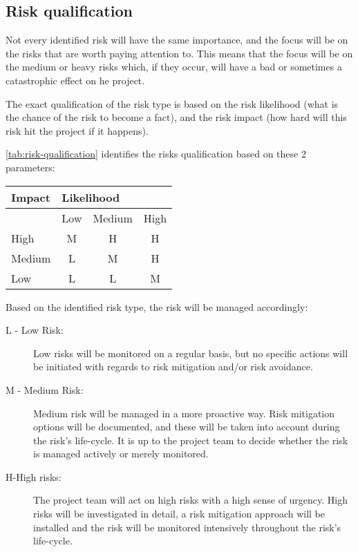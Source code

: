 \subsection{Risk qualification}
Not every identified risk will have the same importance, and the focus will be on the risks that are worth paying attention to.
This means that the focus will be on the medium or heavy risks which, if they occur, will have a bad or sometimes a catastrophic effect on he project.

The exact qualification of the risk type is based on the risk likelihood (what is the chance of the risk to become a fact), and the risk impact (how hard will this risk hit the project if it happens).

\autoref{tab:risk-qualification} identifies the risks qualification based on these 2 parameters:

\begin{table}[h]
\centering
\begin{tabular}{|l|c|c|c|}
\hline
Impact & \multicolumn{3}{l|}{Likelihood}                                                     \\ \hline
       & \multicolumn{1}{l|}{Low}  & \multicolumn{1}{l|}{Medium} & \multicolumn{1}{l|}{High} \\ \hline
High   & \cellcolor[HTML]{FFCB2F}M & \cellcolor[HTML]{FE0000}H   & \cellcolor[HTML]{FE0000}H \\ \hline
Medium & \cellcolor[HTML]{34FF34}L & \cellcolor[HTML]{FFCB2F}M   & \cellcolor[HTML]{FE0000}H \\ \hline
Low    & \cellcolor[HTML]{34FF34}L & \cellcolor[HTML]{34FF34}L   & \cellcolor[HTML]{FFC702}M \\ \hline
\end{tabular}
\end{table}

\noindent
Based on the identified risk type, the risk will be managed accordingly:
\begin{description}
	\item [L - Low Risk:]
	Low risks will be monitored on a regular basis, but no specific actions will be initiated with regards to risk mitigation and/or risk avoidance.
	\item [M - Medium Risk:]
	Medium risk will be managed in a more proactive way.
	Risk mitigation options will be documented, and these will be taken into account during the risk's life-cycle.
	It is up to the project team to decide whether the risk is managed actively or merely monitored.
	\item[H-High risks:]
	The project team will act on high risks with a high sense of urgency.
	High risks will be investigated in detail, a risk mitigation approach will be installed and the risk will be monitored intensively throughout the risk's life-cycle.
\end {description}


